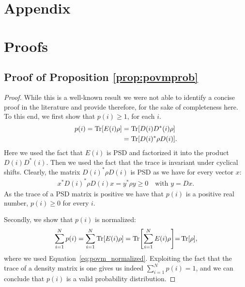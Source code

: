 \section*{\LARGE Appendix}

\section{Proofs}


\subsection{Proof of Proposition \ref{prop:povmprob}}
\label{sec:proof:prop:povmprob}

\proppovmprob*

\begin{proof}
	While this is a well-known result we were not able to identify a concise proof in the literature and provide therefore, for the sake of completeness here. To this end, we
	first show that $p(i)\geq 1$, for each $i$.
	\begin{align}
		p(i)
		=
		\Tr [ E(i) \rho ]
		 &
		=
		\Tr [ D(i) D^*(i)  \rho ]
		\\
		 &
		=
		\Tr [ D(i)^*  \rho D(i) ]. \nonumber
	\end{align}
	Here we used the fact that $E(i)$ is PSD and factorized it into the product $D(i) D^*(i)$. Then we used the fact that the trace is invariant under cyclical shifts.
	Clearly, the matrix $ D(i)^*  \rho D(i)$ is PSD as we have for every vector $x$:
	\begin{align}
		x^* D(i)^*  \rho D(i) x = y^* \rho y \geq 0 \quad \text{with } y = Dx.
		\label{eq:def:psdPOVM}
	\end{align}
	As the trace of a PSD matrix is positive we have that $p(i)$ is a positive real number, \ie $p(i){\geq} 0$ for every $i$.

	Secondly, we show that $p(i)$ is normalized:
	\begin{align}
		\sum_{i=1}^N p(i)
		=
		\sum_{i=1}^N \Tr [ E(i) \rho ]
		=
		\Tr [ \sum_{i=1}^N E(i) \rho ]
		{=}
		\Tr [  \rho ],
	\end{align}
	where we used Equation~\ref{eq:povm_normalized}.
	Exploiting the fact that the trace of a density matrix is one gives us indeed $\sum_{i=1}^N p(i)=1$, and we can conclude that $p(i)$ is a valid probability distribution.
\end{proof}






